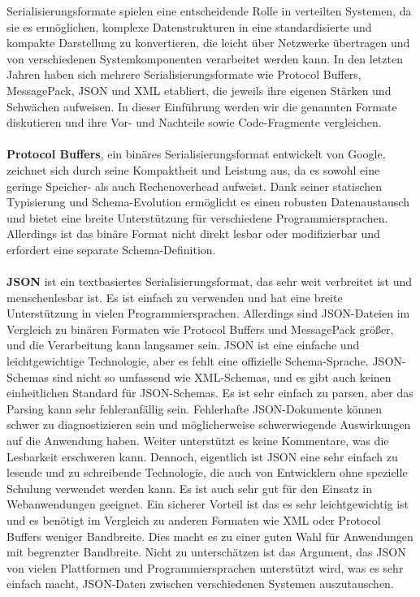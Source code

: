 \documentclass[../vs-script-first-v01.tex]{subfiles}
\begin{document}
Serialisierungsformate spielen eine entscheidende Rolle in verteilten Systemen, da sie es ermöglichen, komplexe Datenstrukturen in eine standardisierte und kompakte Darstellung zu konvertieren, die leicht über Netzwerke übertragen und von verschiedenen Systemkomponenten verarbeitet werden kann. In den letzten Jahren haben sich mehrere Serialisierungsformate wie Protocol Buffers, MessagePack, JSON und XML etabliert, die jeweils ihre eigenen Stärken und Schwächen aufweisen. In dieser Einführung werden wir die genannten Formate diskutieren und ihre Vor- und Nachteile sowie Code-Fragmente vergleichen.
\\\\
\textbf{Protocol Buffers}, ein binäres Serialisierungsformat entwickelt von Google, zeichnet sich durch seine Kompaktheit und Leistung aus, da es sowohl eine geringe Speicher- als auch Rechenoverhead aufweist. Dank seiner statischen Typisierung und Schema-Evolution ermöglicht es einen robusten Datenaustausch und bietet eine breite Unterstützung für verschiedene Programmiersprachen. Allerdings ist das binäre Format nicht direkt lesbar oder modifizierbar und erfordert eine separate Schema-Definition.
\\\\
\textbf{JSON} ist ein textbasiertes Serialisierungsformat, das sehr weit verbreitet ist und menschenlesbar ist. Es ist einfach zu verwenden und hat eine breite Unterstützung in vielen Programmiersprachen. Allerdings sind JSON-Dateien im Vergleich zu binären Formaten wie Protocol Buffers und MessagePack größer, und die Verarbeitung kann langsamer sein.
JSON ist eine einfache und leichtgewichtige Technologie, aber es fehlt eine offizielle Schema-Sprache. JSON-Schemas sind nicht so umfassend wie XML-Schemas, und es gibt auch keinen einheitlichen Standard für JSON-Schemas. Es ist sehr einfach zu parsen, aber das Parsing kann sehr fehleranfällig sein. Fehlerhafte JSON-Dokumente können schwer zu diagnostizieren sein und möglicherweise schwerwiegende Auswirkungen auf die Anwendung haben. Weiter unterstützt es keine Kommentare, was die Lesbarkeit erschweren kann.
Dennoch, eigentlich ist JSON eine sehr einfach zu lesende und zu schreibende Technologie, die auch von Entwicklern ohne spezielle Schulung verwendet werden kann. Es ist auch sehr gut für den Einsatz in Webanwendungen geeignet.
Ein sicherer Vorteil ist das es sehr leichtgewichtig ist und es benötigt im Vergleich zu anderen Formaten wie XML oder Protocol Buffers weniger Bandbreite. Dies macht es zu einer guten Wahl für Anwendungen mit begrenzter Bandbreite.
Nicht zu unterschätzen ist das Argument, das JSON  von vielen Plattformen und Programmiersprachen unterstützt wird, was es sehr einfach macht, JSON-Daten zwischen verschiedenen Systemen auszutauschen.\\\\
\end{document}
